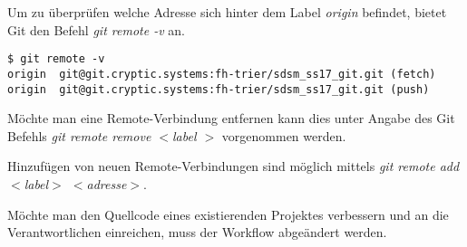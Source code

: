 Um zu überprüfen welche Adresse sich hinter dem Label \textit{origin} befindet, bietet Git den Befehl \textit{git remote -v} an.

\begin{verbatim}
$ git remote -v
origin  git@git.cryptic.systems:fh-trier/sdsm_ss17_git.git (fetch)
origin  git@git.cryptic.systems:fh-trier/sdsm_ss17_git.git (push)
\end{verbatim}
 
Möchte man eine Remote-Verbindung entfernen kann dies unter Angabe des Git Befehls \textit{git remote remove  $ < $label $ > $} vorgenommen werden. 
  
Hinzufügen von neuen Remote-Verbindungen sind möglich mittels \textit{git remote add $ < $label$ > $ $ < $adresse$ > $}.

\begin{INFO}
  Möchte man den Quellcode eines existierenden Projektes verbessern und an die Verantwortlichen einreichen, muss der Workflow abgeändert werden.
\end{INFO}